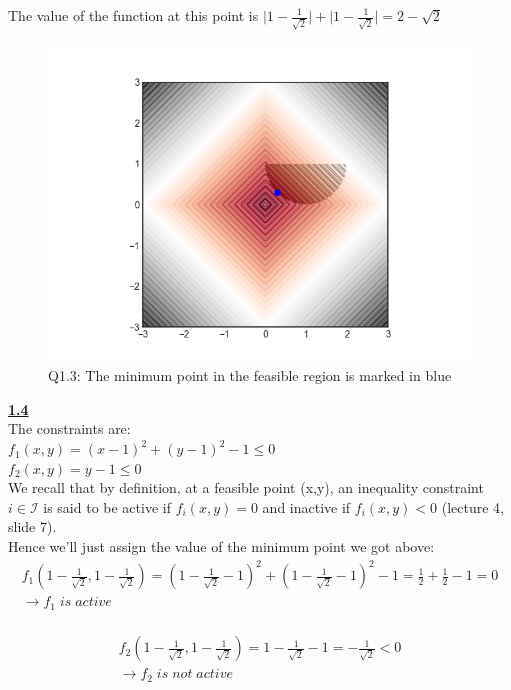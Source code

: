 \documentclass[fleqn]{article}
\begin{document}
The value of the function at this point is $\lvert 1-\frac{1}{\sqrt{2}} \rvert + \lvert1-\frac{1}{\sqrt{2}}\rvert = 2 - \sqrt{2}$\\

\begin{figure}[h!]
\includegraphics[width=0.8\linewidth]{q1_3.PNG}
\caption{Q1.3: The minimum point in the feasible region is marked in blue}
\end{figure}

\underline{\textbf{1.4}} \\
The constraints are: \\
$f_1 (x,y) = (x-1)^2+(y-1)^2-1 \leq 0$ \\
$f_2 (x,y) = y-1 \leq 0$ \\

We recall that by definition, at a feasible point (x,y), an inequality constraint $ i \in \mathcal{I}$ is said to be active if $f_i (x,y) = 0$ and inactive if $f_i (x,y) < 0$ (lecture 4, slide 7).\\
Hence we'll just assign the value of the minimum point we got above: \\
\begin{multline*}
f_1(1-\frac{1}{\sqrt{2}}, 1-\frac{1}{\sqrt{2}}) = 
(1-\frac{1}{\sqrt{2}}-1)^2 + (1-\frac{1}{\sqrt{2}}-1)^2 -1 = 
\frac{1}{2}+\frac{1}{2}-1 = 0 \\
\rightarrow \boxed{f_1 \; is \; active}
\end{multline*} \\

\begin{multline*}
f_2(1-\frac{1}{\sqrt{2}}, 1-\frac{1}{\sqrt{2}}) = 
1-\frac{1}{\sqrt{2}}-1 = -\frac{1}{\sqrt{2}} < 0 \\
\rightarrow \boxed{f_2 \; is \; not\; active}
\end{multline*} \\
\end{document}
